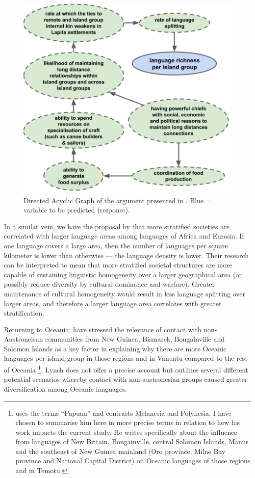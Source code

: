 \documentclass[a4paper,10pt]{article} %
\begin{document}
\begin{figure}[ht]
\centering
\includegraphics[width=16cm]{illustrations/Predicting_lgs_DAG_andy.png}
\caption{Directed Acyclic Graph of the argument presented in \cite{pawley2007}. Blue = variable to be predicted (response).}
\label{Predicting_lgs_DAG_andy}
\end{figure}

In a similar vein, we have the proposal by \citet{curriemace2009} that more stratified societies are correlated with larger language areas among languages of Africa and Eurasia. If one language covers a large area, then the number of languages per square kilometer is lower than otherwise --- the language density is lower. Their research can be interpreted to mean that more stratified societal structures are more capable of sustaining linguistic homogeneity over a larger geographical area (or possibly reduce diversity by cultural dominance and warfare). Greater maintenance of cultural homogeneity would result in less language splitting over larger areas, and therefore a larger language area correlates with greater stratification. 

Returning to Oceania; \citet[104]{lynch1981melanesian} have stressed the relevance of contact with non-Austroneisan communities from New Guinea, Bismarck, Bougainville and Solomon Islands as a key factor in explaining why there are more Oceanic languages per island group in those regions and in Vanuatu compared to the rest of Oceania \footnote{\citet{lynch1981melanesian} uses the terms ``Papuan'' and contrasts Melanesia and Polynesia. I have chosen to summarise him here in more precise terms in relation to how his work impacts the current study. He writes specifically about the influence from languages of New Britain, Bougainville, central Solomon Islands, Manus and the southeast of New Guinea mainland (Oro province, Milne Bay province and National Capital District) on Oceanic languages of those regions and in Temotu.}. Lynch does not offer a precise account but outlines several different potential scenarios whereby contact with non-austronesian groups caused greater diversification among Oceanic languages.
\end{document}

